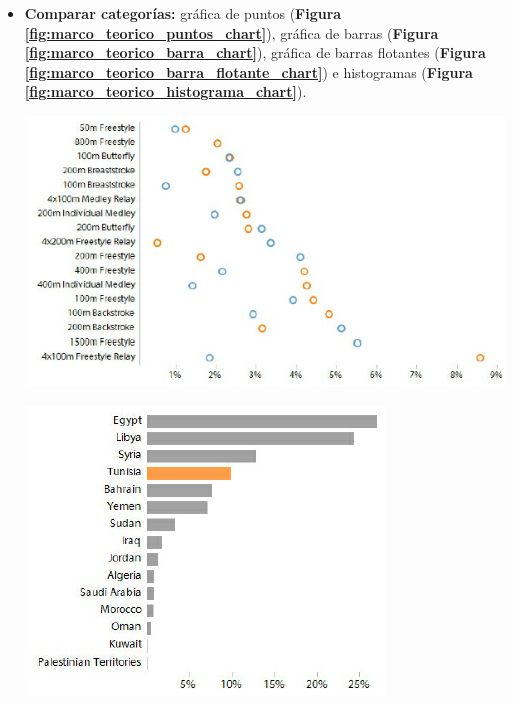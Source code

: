 \begin{itemize}
    \item\textbf{Comparar categorías:} gráfica de puntos (\textbf{Figura \ref{fig:marco_teorico_puntos_chart}}), gráfica de barras (\textbf{Figura \ref{fig:marco_teorico_barra_chart}}), gráfica de barras flotantes (\textbf{Figura \ref{fig:marco_teorico_barra_flotante_chart}}) e histogramas (\textbf{Figura \ref{fig:marco_teorico_histograma_chart}}).
    \begin{center}
        \bigbreak
        \includegraphics[scale=0.5]{images/marco_teorico/puntos_chart.png}
        \label{fig:marco_teorico_puntos_chart}
        \bigbreak
        
        \includegraphics[scale=0.75]{images/marco_teorico/barra_chart.png}
        \label{fig:marco_teorico_barra_chart}
        \bigbreak
    

\end{center}
\end{itemize}
